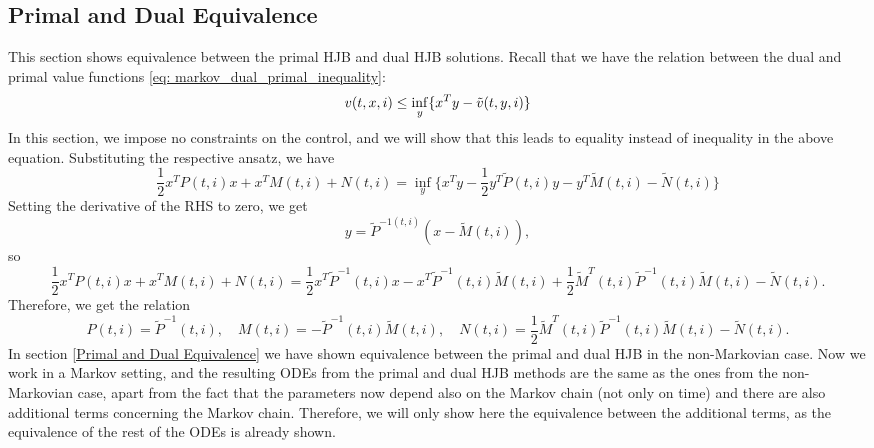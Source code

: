\subsection{Primal and Dual Equivalence}
This section shows equivalence between the primal HJB and dual HJB solutions. Recall that we have the relation between the dual and primal value functions \eqref{eq: markov_dual_primal_inequality}:
\begin{equation*}
    v(t,x,i) \le \inf_y \{x^T y - \Tilde{v}(t,y,i)  \}
\end{equation*}
In this section, we impose no constraints on the control, and we will show that this leads to equality instead of inequality in the above equation. Substituting the respective ansatz, we have
\begin{equation*}
    \frac12 x^T P(t,i) x + x^T M(t,i) + N(t,i) = \inf_y \bigg\{ x^T y - \frac12 y^T \tilde{P}(t,i) y - y^T \tilde{M}(t,i) - \tilde{N}(t,i)  \bigg\}
\end{equation*}
Setting the derivative of the RHS to zero, we get 
\begin{equation*}
    y = \tilde{P}^{-1(t,i)}(x - \tilde{M}(t,i)),
\end{equation*}
so
\begin{equation*}
    \frac12 x^T P(t,i) x + x^T M(t,i) + N(t,i) = \frac12 x^T \tilde{P}^{-1}(t,i)x - x^T \tilde{P}^{-1}(t,i)\tilde{M}(t,i) + \frac12 \tilde{M}^T(t,i) \tilde{P}^{-1}(t,i) \tilde{M}(t,i) - \tilde{N}(t,i).
\end{equation*}
Therefore, we get the relation
\begin{equation}
    P(t,i) = \tilde{P}^{-1}(t,i), \quad M(t,i) = -\tilde{P}^{-1}(t,i) \tilde{M}(t,i), \quad N(t,i) =  \frac12 \tilde{M}^T(t,i) \tilde{P}^{-1}(t,i) \tilde{M}(t,i) - \tilde{N}(t,i). \label{eq: markov_relation}
\end{equation}
In section \ref{Primal and Dual Equivalence} we have shown equivalence between the primal and dual HJB in the non-Markovian case. Now we work in a Markov setting, and the resulting ODEs from the primal and dual HJB methods are the same as the ones from the non-Markovian case, apart from the fact that the parameters now depend also on the Markov chain (not only on time) and there are also additional terms concerning the Markov chain. Therefore, we will only show here the equivalence between the additional terms, as the equivalence of the rest of the ODEs is already shown.\\

